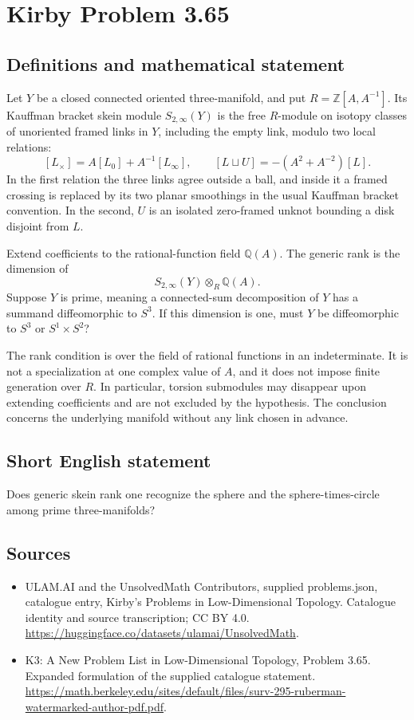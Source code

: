 \documentclass[11pt,a4paper]{article}
\begin{document}
\section*{Kirby Problem 3.65}\label{statement}

\subsection{Definitions and mathematical statement}
Let $Y$ be a closed connected oriented three-manifold, and put $R=\mathbb Z[A,A^{-1}]$. Its Kauffman bracket skein module $S_{2,\infty}(Y)$ is the free $R$-module on isotopy classes of unoriented framed links in $Y$, including the empty link, modulo two local relations:
\[
[L_\times]=A[L_0]+A^{-1}[L_\infty],\qquad
[L\sqcup U]=-(A^2+A^{-2})[L].
\]
In the first relation the three links agree outside a ball, and inside it a framed crossing is replaced by its two planar smoothings in the usual Kauffman bracket convention. In the second, $U$ is an isolated zero-framed unknot bounding a disk disjoint from $L$.

Extend coefficients to the rational-function field $\mathbb Q(A)$. The generic rank is the dimension of
\[
S_{2,\infty}(Y)\otimes_R\mathbb Q(A).
\]
Suppose $Y$ is prime, meaning a connected-sum decomposition of $Y$ has a summand diffeomorphic to $S^3$. If this dimension is one, must $Y$ be diffeomorphic to $S^3$ or $S^1\times S^2$?

The rank condition is over the field of rational functions in an indeterminate. It is not a specialization at one complex value of $A$, and it does not impose finite generation over $R$. In particular, torsion submodules may disappear upon extending coefficients and are not excluded by the hypothesis. The conclusion concerns the underlying manifold without any link chosen in advance.
\subsection{Short English statement}
Does generic skein rank one recognize the sphere and the sphere-times-circle among prime three-manifolds?
\subsection{Sources}
\begin{itemize}
\item[S1] ULAM.AI and the UnsolvedMath Contributors, supplied problems.json, catalogue entry, Kirby's Problems in Low-Dimensional Topology. Catalogue identity and source transcription; CC BY 4.0.
\url{https://huggingface.co/datasets/ulamai/UnsolvedMath}.
\item[S2] K3: A New Problem List in Low-Dimensional Topology, Problem 3.65. Expanded formulation of the supplied catalogue statement.
\url{https://math.berkeley.edu/sites/default/files/surv-295-ruberman-watermarked-author-pdf.pdf}.
\end{itemize}
\end{document}
